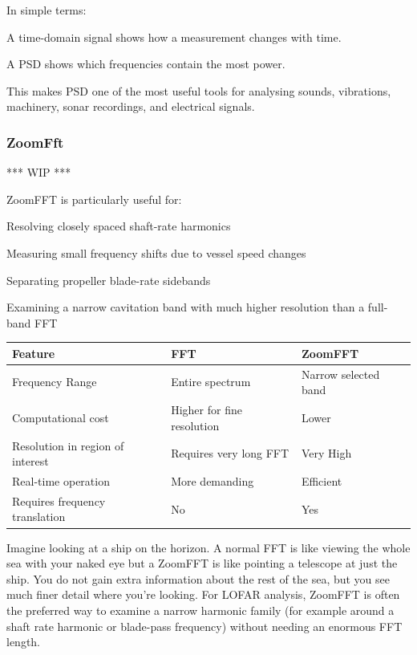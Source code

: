 In simple terms:
\begin{compactitem}
    \item A time-domain signal shows how a measurement changes with time.
    \item A PSD shows which frequencies contain the most power.
\end{compactitem}

This makes PSD one of the most useful tools for analysing sounds, vibrations, machinery, sonar recordings, and electrical signals.

\subsubsection{ZoomFft}
\textcolor{commentGreen}{*** WIP ***}

ZoomFFT is particularly useful for:
\begin{compactitem}
    \item Resolving closely spaced shaft-rate harmonics
    \item Measuring small frequency shifts due to vessel speed changes
    \item Separating propeller blade-rate sidebands
    \item Examining a narrow cavitation band with much higher resolution than a full-band FFT
\end{compactitem}

\begin{tabularx}{\linewidth}{l X X}
    \toprule
    \textbf{Feature} & \textbf{FFT} & \textbf{ZoomFFT}\\
    \midrule
    Frequency Range & Entire spectrum & Narrow selected band \\
    Computational cost & Higher for fine resolution & Lower \\
    Resolution in region of interest & Requires very long FFT & Very High\\
    Real-time operation & More demanding & Efficient \\
    Requires frequency translation & No & Yes \\
    \bottomrule
\end{tabularx}\par\vspace{0.5em}

Imagine looking at a ship on the horizon. A normal FFT is like viewing the whole sea with your naked eye but a ZoomFFT is like pointing a telescope at just the ship. You do not gain extra information about the rest of the sea, but you see much finer detail where you're looking. For LOFAR analysis, ZoomFFT is often the preferred way to examine a narrow harmonic family (for example around a shaft rate harmonic or blade-pass frequency) without needing an enormous FFT length.

